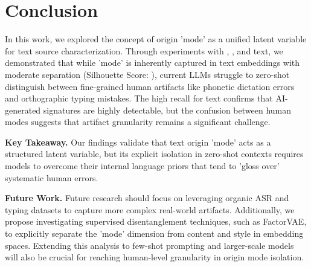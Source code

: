 \section{Conclusion}
\label{sec:conclusion}

In this work, we explored the concept of origin 'mode' as a unified latent variable for text source characterization.
Through experiments with \aigen, \dictated, and \typed text, we demonstrated that while 'mode' is inherently captured in text embeddings with moderate separation (Silhouette Score: \silhouette), current LLMs struggle to zero-shot distinguish between fine-grained human artifacts like phonetic dictation errors and orthographic typing mistakes.
The high recall for \aigen text confirms that AI-generated signatures are highly detectable, but the confusion between human modes suggests that artifact granularity remains a significant challenge.

{\bf Key Takeaway.}
Our findings validate that text origin 'mode' acts as a structured latent variable, but its explicit isolation in zero-shot contexts requires models to overcome their internal language priors that tend to 'gloss over' systematic human errors.

{\bf Future Work.}
Future research should focus on leveraging organic ASR and typing datasets to capture more complex real-world artifacts.
Additionally, we propose investigating supervised disentanglement techniques, such as FactorVAE, to explicitly separate the 'mode' dimension from content and style in embedding spaces.
Extending this analysis to few-shot prompting and larger-scale models will also be crucial for reaching human-level granularity in origin mode isolation.
